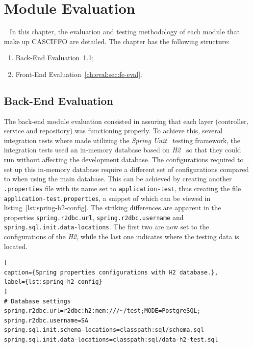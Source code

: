 % 
%
\chapter{Module Evaluation}~\label{ch:eval}
In this chapter, the evaluation and testing methodology of each module that make up CASCIFFO are detailed.
The chapter has the following structure:
\begin{enumerate}
    \item Back-End Evaluation~\ref{ch:eval:sec:be-eval};
    \item Front-End Evaluation~\ref{ch:eval:sec:fe-eval}.
\end{enumerate}

\section{Back-End Evaluation}\label{ch:eval:sec:be-eval}

The back-end module evaluation consisted in assuring that each layer (controller, service and repository) was functioning properly. To achieve this, several integration tests where made utilizing the \textit{Spring Unit}~\cite{spring-testing-unit} testing framework, the integration tests used an in-memory database based on \textit{H2}~\cite{h2-db} so that they could run without affecting the development database. The configurations required to set up this in-memory database require a different set of configurations compared to when using the main database. This can be achieved by creating another \texttt{.properties} file with its name set to \texttt{application-test}, thus creating the file \lstinline{application-test.properties}, a snippet of which can be viewed in listing~\ref{lst:spring-h2-config}. The striking differences are apparent in the properties \lstinline{spring.r2dbc.url}, \lstinline{spring.r2dbc.username} and \lstinline{spring.sql.init.data-locations}. The first two are now set to the configurations of the \textit{H2}, while the last one indicates where the testing data is located.

\begin{lstlisting}[
caption={Spring properties configurations with H2 database.},
label={lst:spring-h2-config}
]
# Database settings
spring.r2dbc.url=r2dbc:h2:mem:///~/test;MODE=PostgreSQL;
spring.r2dbc.username=SA
spring.sql.init.schema-locations=classpath:sql/schema.sql
spring.sql.init.data-locations=classpath:sql/data-h2-test.sql
\end{lstlisting}

